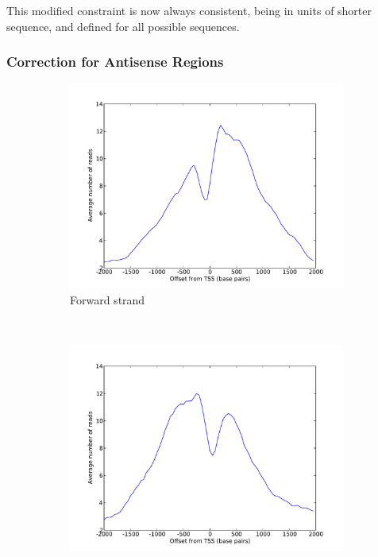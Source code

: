 \documentclass[parskip]{cs4rep}
\begin{document}
This modified constraint is now always consistent, being in units of shorter sequence, and defined for all possible sequences.

\subsubsection{Correction for Antisense Regions}
\begin{figure}
    \centering
    \begin{subfigure}[b]{0.3\textwidth}
         \centering
         \includegraphics[width=\textwidth]{figures/DTW/forward_strand.pdf}
         \caption{Forward strand}
         \label{fig:DTW:antisense_comparison:forward}
    \end{subfigure}
    ~
    \begin{subfigure}[b]{0.3\textwidth}
         \centering
         \includegraphics[width=\textwidth]{figures/DTW/reverse_strand.pdf}

\end{subfigure}
\end{figure}
\end{document}
